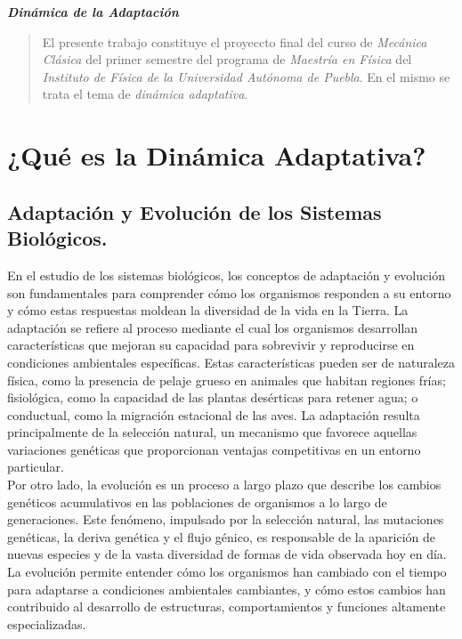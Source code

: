 \documentclass[letterpaper]{article}
\newcommand{\Title}[1]{\begin{center} \LARGE{\textbf{\textit{#1}}} \end{center}}
\newcommand{\Abstract}[1]{\begin{abstract} \normalsize{#1} \end{abstract}}
\begin{document}
\Title{Dinámica de la Adaptación}

    \Abstract{El presente trabajo constituye el proyeccto final del curso de \textit{Mecánica Clásica} del primer semestre del programa de \textit{Maestría en Física} del \textit{Instituto de Física de la Universidad Autónoma de Puebla}. En el mismo se trata el tema de \textit{dinámica adaptativa}.}

    \tableofcontents

    \clearpage

    \section{¿Qué es la Dinámica Adaptativa?}{
    	\subsection{Adaptación y Evolución de los Sistemas Biológicos.}{

            \normalsize{En el estudio de los sistemas biológicos, los conceptos de adaptación y evolución son fundamentales para comprender cómo los organismos responden a su entorno y cómo estas respuestas moldean la diversidad de la vida en la Tierra. La adaptación se refiere al proceso mediante el cual los organismos desarrollan características que mejoran su capacidad para sobrevivir y reproducirse en condiciones ambientales específicas. Estas características pueden ser de naturaleza física, como la presencia de pelaje grueso en animales que habitan regiones frías; fisiológica, como la capacidad de las plantas desérticas para retener agua; o conductual, como la migración estacional de las aves. La adaptación resulta principalmente de la selección natural, un mecanismo que favorece aquellas variaciones genéticas que proporcionan ventajas competitivas en un entorno particular.}\\

            \normalsize{Por otro lado, la evolución es un proceso a largo plazo que describe los cambios genéticos acumulativos en las poblaciones de organismos a lo largo de generaciones. Este fenómeno, impulsado por la selección natural, las mutaciones genéticas, la deriva genética y el flujo génico, es responsable de la aparición de nuevas especies y de la vasta diversidad de formas de vida observada hoy en día. La evolución permite entender cómo los organismos han cambiado con el tiempo para adaptarse a condiciones ambientales cambiantes, y cómo estos cambios han contribuido al desarrollo de estructuras, comportamientos y funciones altamente especializadas.}\\

}}
\end{document}
